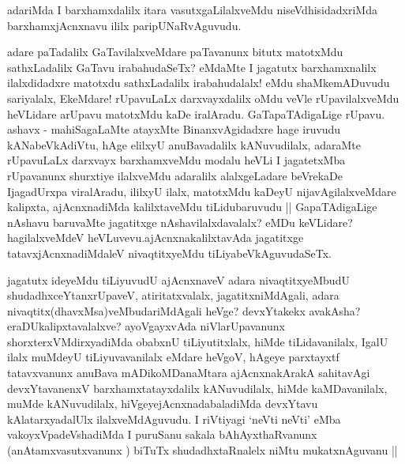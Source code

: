 \begin{artha}
adariMda I barxhamxdalilx itara vasutxgaLilalxveMdu
niseVdhisidadxriMda barxhamxjAcnxnavu ililx paripUNaRvAguvudu. 

adare paTadalilx GaTavilalxveMdare paTavanunx bitutx matotxMdu
sathxLadalilx GaTavu irabahudaSeTx? eMdaMte I jagatutx barxhamxnalilx
ilalxdidadxre matotxdu sathxLadalilx irabahudalalx! eMdu
shaMkemADuvudu sariyalalx, EkeMdare! rUpavuLaLx darxvayxdalilx oMdu
veVle rUpavilalxveMdu heVLidare arUpavu matotxMdu kaDe
iralAradu. GaTapaTAdigaLige rUpavu. ashavx - mahiSagaLaMte atayxMte
BinanxvAgidadxre hage iruvudu kANabeVkAdiVtu, hAge elilxyU
anuBavadalilx kANuvudilalx, adaraMte rUpavuLaLx darxvayx barxhamxveMdu
modalu heVLi I jagatetxMba rUpavanunx shurxtiye ilalxveMdu adaralilx
alalxgeLadare beVrekaDe IjagadUrxpa viralAradu, ililxyU ilalx,
matotxMdu kaDeyU nijavAgilalxveMdare kalipxta, ajAcnxnadiMda
kalilxtaveMdu tiLidubaruvudu || GapaTAdigaLige nAshavu baruvaMte
jagatitxge nAshavilalxdavalalx? eMDu keVLidare? hagilalxveMdeV
heVLuvevu.ajAcnxnakalilxtavAda jagatitxge tatavxjAcnxnadiMdaleV
nivaqtitxyeMdu tiLiyabeVkAguvudaSeTx.
\end{artha}

\begin{artha}
jagatutx ideyeMdu tiLiyuvudU ajAcnxnaveV adara nivaqtitxyeMbudU
shudadhxceYtanxrUpaveV, atiritatxvalalx, jagatitxniMdAgali, adara
nivaqtitx(dhavxMsa)veMbudariMdAgali heVge? devxYtakekx avakAsha?
eraDUkalipxtavalalxve? ayoVgayxvAda niVlarUpavanunx
shorxterxVMdirxyadiMda obabxnU tiLiyutitxlalx, hiMde
tiLidavanilalx, IgalU ilalx muMdeyU tiLiyuvavanilalx eMdare heVgoV,
hAgeye parxtayxtf tatavxvanunx anuBava mADikoMDanaMtara ajAcnxnakArakA
sahitavAgi devxYtavanenxV barxhamxtatayxdalilx kANuvudilalx, hiMde
kaMDavanilalx, muMde kANuvudilalx, hiVgeyejAcnxnadabaladiMda
devxYtavu kAlatarxyadalUlx ilalxveMdAguvudu. I riVtiyagi `neVti neVti'
eMba vakoyxVpadeVshadiMda I puruSanu sakala bAhAyxthaRvanunx
(anAtamxvasutxvanunx ) biTuTx shudadhxtaRnalelx niMtu mukatxnAguvanu ||
\end{artha}


\begin{center}


\end{center}

